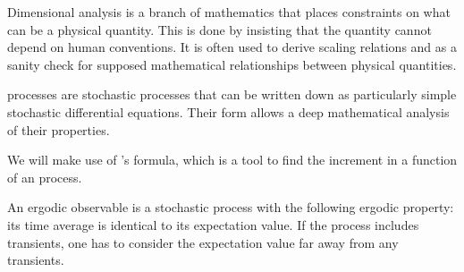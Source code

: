 \item[\bf Dimensional analysis]
Dimensional analysis is a branch of mathematics that places constraints on what can be a physical quantity. This is done by insisting that the quantity cannot depend on human conventions. It is often used to derive scaling relations and as a sanity check for supposed mathematical relationships between physical quantities.

\item[\bf \Ito process]
\Ito processes are stochastic processes that can be written down as particularly simple stochastic differential equations. Their form allows a deep mathematical analysis of their properties.

\item[\bf \Ito's formula]
We will make use of \Ito's formula, which is a tool to find the increment in a function of an \Ito process.

\item[\bf Ergodic observable]
An ergodic observable is a stochastic process with the following ergodic property: its time average is identical to its expectation value. If the process includes transients, one has to consider the expectation value far away from any transients.
\ei



